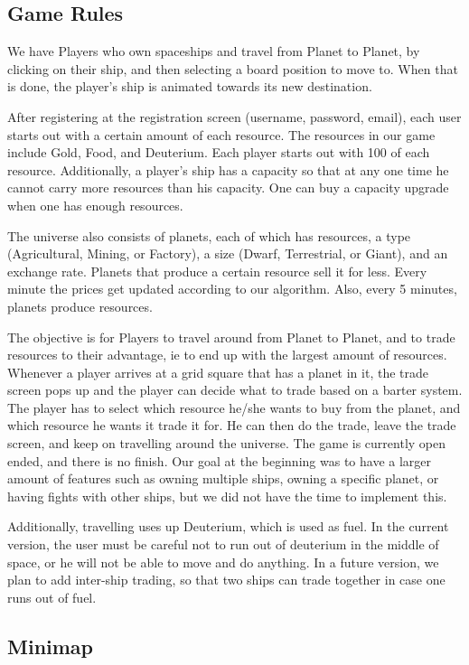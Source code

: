 \documentclass[a4paper,11pt]{article}
\begin{document}
		\subsection{Game Rules}
		
			We have Players who own spaceships and travel from Planet to Planet, by clicking on their ship, and then selecting a board position to move to. When that is done, the player's ship is animated towards its new destination.
		
			After registering at the registration screen (username, password, email), each user starts out with a certain amount of each resource. The resources in our game include Gold, Food, and Deuterium. Each player starts out with 100 of each resource. Additionally, a player's ship has a capacity so that at any one time he cannot carry more resources than his capacity. One can buy a capacity upgrade when one has enough resources.
		
			The universe also consists of planets, each of which has resources, a type (Agricultural, Mining, or Factory), a size (Dwarf, Terrestrial, or Giant), and an exchange rate. Planets that produce a certain resource sell it for less. Every minute the prices get updated according to our algorithm. Also, every 5 minutes, planets produce resources.
		
			The objective is for Players to travel around from Planet to Planet, and to trade resources to their advantage, ie to end up with the largest amount of resources. Whenever a player arrives at a grid square that has a planet in it, the trade screen pops up and the player can decide what to trade based on a barter system. The player has to select which resource he/she wants to buy from the planet, and which resource he wants it trade it for. He can then do the trade, leave the trade screen, and keep on travelling around the universe. The game is currently open ended, and there is no finish. Our goal at the beginning was to have a larger amount of features such as owning multiple ships, owning a specific planet, or having fights with other ships, but we did not have the time to implement this.
			
			Additionally, travelling uses up Deuterium, which is used as fuel. In the current version, the user must be careful not to run out of deuterium in the middle of space, or he will not be able to move and do anything. In a future version, we plan to add inter-ship trading, so that two ships can trade together in case one runs out of fuel.
			
		
		\subsection{Minimap}
			
\end{document}
